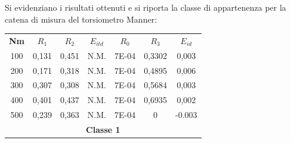 \documentclass[a4paper, twoside]{article}
\begin{document}
\begin{itemize}
\begin{table}[H]
    \centering
    \renewcommand{\arraystretch}{1.2}
\end{table}

Si evidenziano i risultati ottenuti e si riporta la classe di appartenenza per la catena di misura del torsiometro Manner:

\begin{table}[H]
    \centering
    \renewcommand{\arraystretch}{1.2}
    \begin{tabular}{|c|c|c|c|c|c|c|}
        \hline
        \rowcolor{headerblue}
        \multicolumn{7}{|c|}{\textcolor{white}{\textbf{RISULTATI - MANNER}}} \\
        \hline
        \rowcolor{rowlight}
        \textbf{Nm} & \textbf{$R_1$} & \textbf{$R_2$} & \textbf{$E_{itd}$} & \textbf{$R_0$} & \textbf{$R_3$} & \textbf{$E_{id}$} \\
        \hline
        100 & 0,131 & 0,451 & N.M. & 7E-04 & 0,3302 & 0,003 \\
        \hline
        200 & 0,171 & 0,318 & N.M. & 7E-04 & 0,4895 & 0,006 \\
        \hline
        300 & 0,307 & 0,308 & N.M. & 7E-04 & 0,5684 & 0,003 \\
        \hline
        400 & 0,401 & 0,437 & N.M. & 7E-04 & 0,6935 & 0,002 \\
        \hline
        500 & 0,239 & 0,363 & N.M. & 7E-04 & 0 & -0.003 \\
        \hline
        \multicolumn{7}{|c|}{\textbf{Classe 1}} \\
        \hline
    \end{tabular}
\end{table}

\end{itemize}
    \newpage
\end{document}
